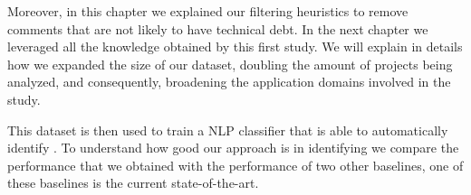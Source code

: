 Moreover, in this chapter we explained our filtering heuristics to remove comments that are not likely to have technical debt. In the next chapter we leveraged all the knowledge obtained by this first study. We will explain in details how we expanded the size of our dataset, doubling the amount of projects being analyzed, and consequently, broadening the application domains involved in the study.

This dataset is then used to train a NLP classifier that is able to automatically identify \SATD. To understand how good our approach is in identifying \SATD we compare the performance that we obtained with the performance of two other baselines, one of these baselines is the current state-of-the-art. 
